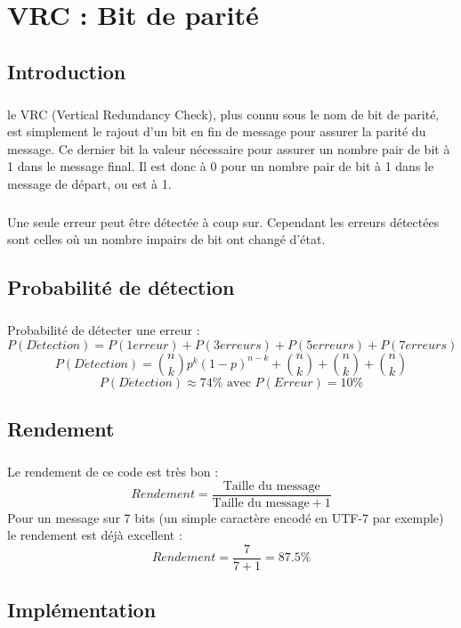 
\chapter{VRC : Bit de parité}

    \section{Introduction}

        \paragraph{}
le VRC (Vertical Redundancy Check), plus connu sous le nom de bit de parité,
est simplement le rajout d'un bit en fin de message pour assurer la parité du message.
Ce dernier bit la valeur nécessaire pour assurer un nombre pair de bit à 1 dans le message final.
Il est donc à 0 pour un nombre pair de bit à 1 dans le message de départ, ou est à 1.
        \paragraph{}
Une seule erreur peut être détectée à coup sur.
Cependant les erreurs détectées sont celles où un nombre impairs de bit ont changé d'état.


    \section{Probabilité de détection}

        \paragraph{}
Probabilité de détecter une erreur :
\[  P(D\acute{e}tection) = P(1 erreur) + P(3 erreurs) + P(5 erreurs) + P(7 erreurs) \]
\[  P(D\acute{e}tection) = {n\choose k}p^k(1-p)^{n-k} + {n\choose k} + {n\choose k} + {n\choose k} \]
\[  P(D\acute{e}tection) \approx 74\% \text{ avec } P( Erreur ) = 10\% \]


    \section{Rendement}

        \paragraph{}
Le rendement de ce code est très bon :
\[  Rendement = \frac{\text{Taille du message}}{\text{Taille du message}+1} \]
Pour un message sur 7 bits (un simple caractère encodé en UTF-7 par exemple) le rendement est déjà excellent :
\[  Rendement = \frac{7}{7+1} = 87.5\% \]


    \section{Implémentation}

        \paragraph{}
